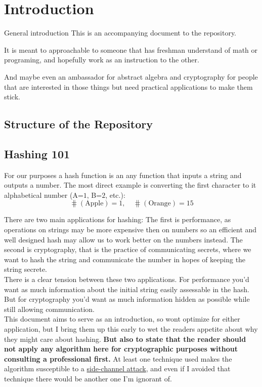 
\chapter{Introduction}
General introduction
This is an accompanying document to the repository.

It is meant to approachable to someone that has freshman understand of math or programing,
and hopefully work as an instruction to the other.

And maybe even an ambassador for abstract algebra and cryptography for people that are interested in those things but need practical applications to make them stick.

\section{Structure of the Repository}

\section{Hashing 101}
For our purposes a hash function is an any function that inputs a string and outputs a number.
The most direct example is converting the first character to it alphabetical number (A=$1$, B=$2$, etc.):
\[\hash(\text{Apple}) = 1,\quad \hash(\text{Orange}) = 15\]

There are two main applications for hashing:
The first is performance,
as operations on strings may be more expensive then on numbers so an efficient and well designed hash may allow us to work better on the numbers instead. 
The second is cryptography,
that is the practice of communicating secrets,
where we want to hash the string and communicate the number in hopes of keeping the string secrete.
\\

There is a clear tension between these two applications.
For performance you'd want as much information about the initial string easily assessable in the hash.
But for cryptography you'd want as much information hidden as possible while still allowing communication. 
\\

This document aims to serve as an introduction,
so wont optimize for either application,
but I bring them up this early to wet the readers appetite about why they might care about hashing.
{\textbf{ But also to state that the reader should not apply any algorithm here for cryptographic purposes without consulting a professional first.}}
At least one technique used makes the algorithm susceptible to a \hyperref[appx:side-channel]{side-channel attack},
and even if I avoided that technique there would be another one I'm ignorant of.


